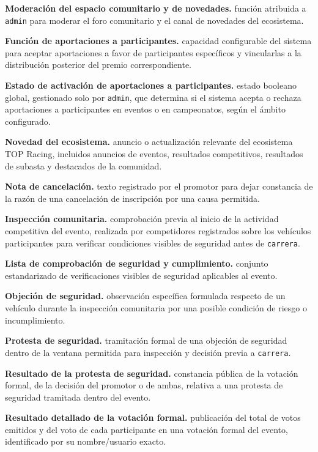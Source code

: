 \documentclass[10pt,letterpaper]{article}
\begin{document}
\noindent\textbf{Moderación del espacio comunitario y de novedades.} función atribuida a \texttt{admin} para moderar el foro comunitario y el canal de novedades del ecosistema.\par
\noindent\textbf{Función de aportaciones a participantes.} capacidad configurable del sistema para aceptar aportaciones a favor de participantes específicos y vincularlas a la distribución posterior del premio correspondiente.\par
\noindent\textbf{Estado de activación de aportaciones a participantes.} estado booleano global, gestionado solo por \texttt{admin}, que determina si el sistema acepta o rechaza aportaciones a participantes en eventos o en campeonatos, según el ámbito configurado.\par
\noindent\textbf{Novedad del ecosistema.} anuncio o actualización relevante del ecosistema TOP Racing, incluidos anuncios de eventos, resultados competitivos, resultados de subasta y destacados de la comunidad.\par
\noindent\textbf{Nota de cancelación.} texto registrado por el promotor para dejar constancia de la razón de una cancelación de inscripción por una causa permitida.\par
\noindent\textbf{Inspección comunitaria.} comprobación previa al inicio de la actividad competitiva del evento, realizada por competidores registrados sobre los vehículos participantes para verificar condiciones visibles de seguridad antes de \texttt{carrera}.\par
\noindent\textbf{Lista de comprobación de seguridad y cumplimiento.} conjunto estandarizado de verificaciones visibles de seguridad aplicables al evento.\par
\noindent\textbf{Objeción de seguridad.} observación específica formulada respecto de un vehículo durante la inspección comunitaria por una posible condición de riesgo o incumplimiento.\par
\noindent\textbf{Protesta de seguridad.} tramitación formal de una objeción de seguridad dentro de la ventana permitida para inspección y decisión previa a \texttt{carrera}.\par
\noindent\textbf{Resultado de la protesta de seguridad.} constancia pública de la votación formal, de la decisión del promotor o de ambas, relativa a una protesta de seguridad tramitada dentro del evento.\par
\noindent\textbf{Resultado detallado de la votación formal.} publicación del total de votos emitidos y del voto de cada participante en una votación formal del evento, identificado por su nombre/usuario exacto.\par
\end{document}
